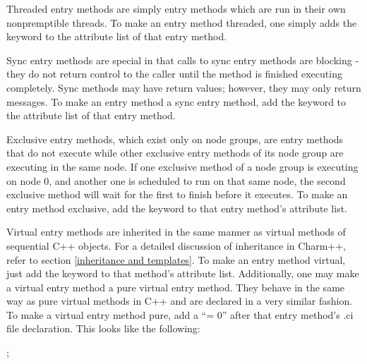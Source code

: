 Threaded entry methods are simply entry
methods which are run in their own nonpremptible threads.  To make an
entry method threaded, one simply adds the keyword
 to the attribute list of that entry method.

Sync entry methods are special in that calls to
sync entry methods are blocking - they do not return control to the caller
until the method is finished executing completely.  Sync methods may have
return values; however, they may only return messages.  To make an entry method a sync entry method, add the keyword  to the
attribute list of that entry method.

Exclusive entry methods, which exist only on node groups, are
entry methods that do not execute while other exclusive
entry methods of its node group are executing in the same
node.  If one exclusive method of a node group is executing on node 0, and
another one is scheduled to run on that same node, the second exclusive method
will wait for the first to finish before it executes.  To make an entry method exclusive, add the keyword  to that
entry method's attribute list.

Virtual entry methods are inherited in the
same manner as virtual methods of sequential C++ objects.  For a detailed
discussion of inheritance in Charm++, refer to section \ref{inheritance and
templates}.  To make an entry method virtual, just add the keyword
 to that method's attribute list.  Additionally, one may make
a virtual entry method a pure virtual entry method.  They
behave in the same way as pure virtual methods in C++ and are declared in a
very similar fashion.  To make a virtual entry method pure, add a ``= 0'' after
that entry method's .ci file declaration.  This looks like the following:

\small
{} ;
\normalsize



